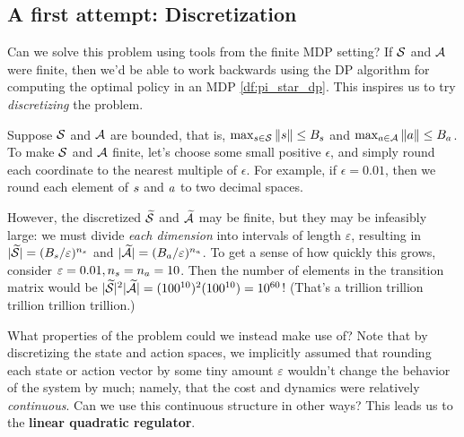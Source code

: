 \documentclass[\main/main]{subfiles}
\begin{document}

\subsection{A first attempt: Discretization}

Can we solve this problem using tools from the finite MDP setting?
If $\S$ and $\A$ were finite, then we'd be able to work backwards using
the DP algorithm for computing the optimal policy in an MDP \eqref{df:pi_star_dp}.
This inspires us to try \emph{discretizing} the problem.

Suppose $\S$ and $\A$ are bounded, that is, $\max_{\st \in \S} \|\st\| \le B_\st$ and
$\max_{\act \in \A} \|\act\| \le B_\act$.
To make $\S$ and $\A$ finite, let's choose some small positive $\epsilon$,
and simply round each coordinate to the nearest multiple of
$\epsilon$. For example, if $\epsilon = 0.01$, then we round each element of $\st$ and $\act$ to two decimal spaces.

However, the discretized $\tilde \S$ and $\tilde \A$ may be finite, but they may be infeasibly large:
we must divide \emph{each dimension} into intervals of length $\varepsilon$,
resulting in $|\tilde \S| = (B_\st/\varepsilon)^{n_\st}$ and $|\tilde \A| = (B_\act/\varepsilon)^{n_\act}$.
To get a sense of how quickly this grows, consider $\varepsilon = 0.01, n_\st = n_\act = 10$. Then the number of elements in the transition matrix would be $|\tilde \S|^2 |\tilde \A| = (100^{10})^2 (100^{10}) = 10^{60}$! (That's a trillion trillion trillion trillion trillion.)

What properties of the problem could we instead make use of? Note that by discretizing the state and action spaces, we implicitly assumed that rounding each state or action vector by some tiny amount $\varepsilon$
wouldn't change the behavior of the system by much;
namely, that the cost and dynamics were relatively \emph{continuous}.
Can we use this continuous structure in other ways? This leads us to the \textbf{linear quadratic regulator}.
\end{document}
